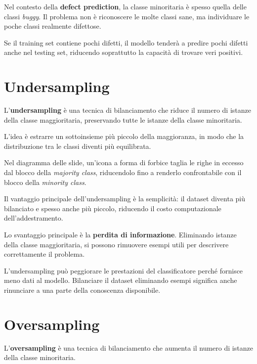 Nel contesto della \textbf{defect prediction}, la classe minoritaria è spesso quella delle classi \emph{buggy}. Il problema non è riconoscere le molte classi sane, ma individuare le poche classi realmente difettose.

Se il training set contiene pochi difetti, il modello tenderà a predire pochi difetti anche nel testing set, riducendo soprattutto la capacità di trovare veri positivi.

\section{Undersampling}

L'\textbf{undersampling} è una tecnica di bilanciamento che riduce il numero di istanze della classe maggioritaria, preservando tutte le istanze della classe minoritaria.

L'idea è estrarre un sottoinsieme più piccolo della maggioranza, in modo che la distribuzione tra le classi diventi più equilibrata.

\begin{notaslide}
Nel diagramma delle slide, un'icona a forma di forbice taglia le righe in eccesso dal blocco della \emph{majority class}, riducendolo fino a renderlo confrontabile con il blocco della \emph{minority class}.
\end{notaslide}

Il vantaggio principale dell'undersampling è la semplicità: il dataset diventa più bilanciato e spesso anche più piccolo, riducendo il costo computazionale dell'addestramento.

Lo svantaggio principale è la \textbf{perdita di informazione}. Eliminando istanze della classe maggioritaria, si possono rimuovere esempi utili per descrivere correttamente il problema.

\begin{notaprof}
L'undersampling può peggiorare le prestazioni del classificatore perché fornisce meno dati al modello. Bilanciare il dataset eliminando esempi significa anche rinunciare a una parte della conoscenza disponibile.
\end{notaprof}

\section{Oversampling}

L'\textbf{oversampling} è una tecnica di bilanciamento che aumenta il numero di istanze della classe minoritaria.

